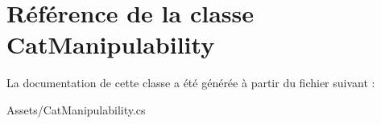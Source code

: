 \section{Référence de la classe Cat\+Manipulability}
\label{class_cat_manipulability}


La documentation de cette classe a été générée à partir du fichier suivant \+:\begin{DoxyCompactItemize}
\item 
Assets/Cat\+Manipulability.\+cs\end{DoxyCompactItemize}
